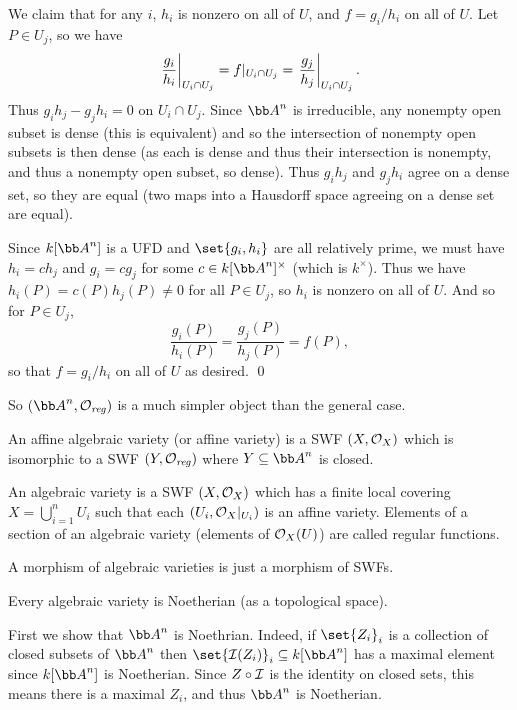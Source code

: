     We claim that for any $i$, $h_i$ is nonzero on all of $U$, and $f=g_i/h_i$ on all of $U$.
    Let $P\in U_j$, so we have
    $$ \left.{{g_i}\over{h_i}}\right|_{U_i\cap U_j} = f|_{U_i\cap U_j} = \left.{{g_j}\over{h_j}}\right|_{U_i\cap U_j} . $$
    Thus $g_ih_j-g_jh_i=0$ on $U_i\cap U_j$.
    Since $\bA^n$ is irreducible, any nonempty open subset is dense (this is equivalent) and so the intersection of nonempty open subsets
    is then dense (as each is dense and thus their intersection is nonempty, and thus a nonempty open subset, so dense).
    Thus $g_ih_j$ and $g_jh_i$ agree on a dense set, so they are equal (two maps into a Hausdorff space agreeing on a dense set are equal).

    Since $k[\bA^n]$ is a UFD and $\set{g_i,h_i}$ are all relatively prime, we must have $h_i=ch_j$ and $g_i=cg_j$ for some
    $c\in k[\bA^n]^\times$ (which is $k^\times$).
    Thus we have $h_i(P)=c(P)h_j(P)\neq0$ for all $P\in U_j$, so $h_i$ is nonzero on all of $U$.
    And so for $P\in U_j$,
    $$ \frac{g_i(P)}{h_i(P)} = \frac{g_j(P)}{h_j(P)} = f(P) , $$
    so that $f=g_i/h_i$ on all of $U$ as desired.
    \qed

\eproof

So $(\bA^n,\O_\reg)$ is a much simpler object than the general case.

\bdefn

    An {\emphcolor affine algebraic variety} (or {\emphcolor affine variety}) is a SWF $(X,{{\cal O}}_X)$ which is isomorphic to a SWF
    $(Y,{{\cal O}}_{\it reg})$ where $Y\subseteq\bA^n$ is closed.

    An {\emphcolor algebraic variety} is a SWF $(X,{{\cal O}}_X)$ which has a finite local covering $X=\bigcup_{i=1}^nU_i$ such that each
    $(U_i,{{\cal O}}_X|_{U_i})$ is an affine variety.
    Elements of a section of an algebraic variety (elements of ${{\cal O}}_X(U)$) are called {\emphcolor regular functions}.

    A morphism of algebraic varieties is just a morphism of SWFs.

\edefn

\blemm

    Every algebraic variety is Noetherian (as a topological space).

\elemm

\bproof

    First we show that $\bA^n$ is Noethrian.
    Indeed, if $\set{Z_i}_i$ is a collection of closed subsets of $\bA^n$ then $\set{\I(Z_i)}_i\subseteq k[\bA^n]$ has a maximal element
    since $k[\bA^n]$ is Noetherian.
    Since $Z\circ{{\cal I}}$ is the identity on closed sets, this means there is a maximal $Z_i$, and thus $\bA^n$ is Noetherian.

